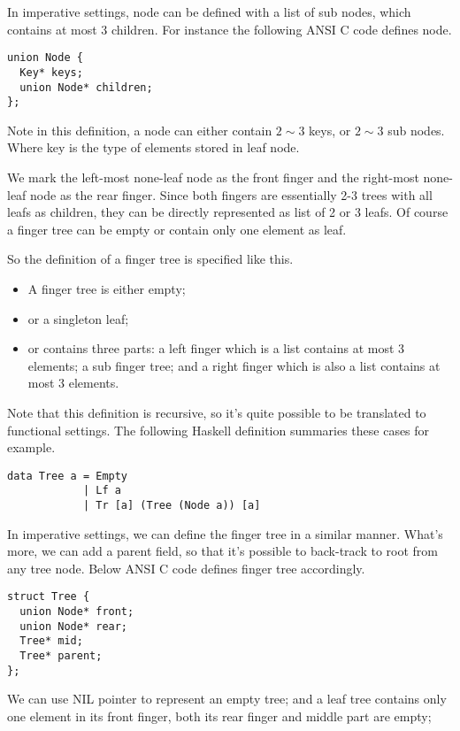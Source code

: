 \documentclass[UTF8]{article}
\begin{document}
In imperative settings, node can be defined with a list of sub nodes, which contains
at most 3 children. For instance the following ANSI C code defines node.

\lstset{language=C}
\begin{lstlisting}
union Node {
  Key* keys;
  union Node* children;
};
\end{lstlisting}

Note in this definition, a node can either contain $2 \sim 3$ keys, or $2 \sim 3$ sub nodes.
Where key is the type of elements stored in leaf node.

We mark the left-most none-leaf node as the front finger and the right-most
none-leaf node as the rear finger. Since both fingers are essentially
2-3 trees with all leafs as children, they can be directly represented as
list of 2 or 3 leafs. Of course a finger tree can be empty or contain
only one element as leaf.

So the definition of a finger tree is specified like this.

\begin{itemize}
\item A finger tree is either empty;
\item or a singleton leaf;
\item or contains three parts: a left finger which is a list contains at most
3 elements; a sub finger tree; and a right finger which is also a list contains
at most 3 elements.
\end{itemize}

Note that this definition is recursive, so it's quite possible to be translated
to functional settings. The following Haskell definition summaries these cases
for example.

\lstset{language=Haskell}
\begin{lstlisting}
data Tree a = Empty
            | Lf a
            | Tr [a] (Tree (Node a)) [a]
\end{lstlisting}

In imperative settings, we can define the finger tree in a similar manner. What's more,
we can add a parent field, so that it's possible to back-track to root from any tree node.
Below ANSI C code defines finger tree accordingly.

\lstset{language=C}
\begin{lstlisting}
struct Tree {
  union Node* front;
  union Node* rear;
  Tree* mid;
  Tree* parent;
};
\end{lstlisting}

We can use NIL pointer to represent an empty tree; and a leaf tree contains only one element
in its front finger, both its rear finger and middle part are empty;
\end{document}
